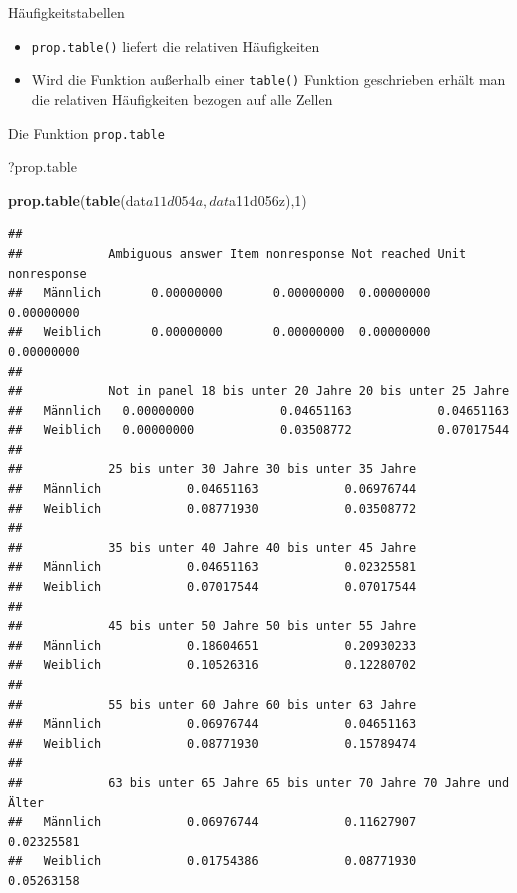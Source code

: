 \documentclass[ignorenonframetext,]{beamer}
\newenvironment{Shaded}{}{}
\newcommand{\KeywordTok}[1]{\textcolor[rgb]{0.00,0.44,0.13}{\textbf{{#1}}}}
\newcommand{\DecValTok}[1]{\textcolor[rgb]{0.25,0.63,0.44}{{#1}}}
\newcommand{\NormalTok}[1]{{#1}}
\providecommand{\tightlist}{%
\setlength{\itemsep}{0pt}\setlength{\parskip}{0pt}}
\begin{document}
\begin{frame}[fragile]{Häufigkeitstabellen}

\begin{itemize}
\tightlist
\item
  \texttt{prop.table()} liefert die relativen Häufigkeiten
\item
  Wird die Funktion außerhalb einer \texttt{table()} Funktion
  geschrieben erhält man die relativen Häufigkeiten bezogen auf alle
  Zellen
\end{itemize}

\end{frame}

\begin{frame}[fragile]{Die Funktion \texttt{prop.table}}

\begin{Shaded}
\begin{Highlighting}[]
\NormalTok{?prop.table}
\end{Highlighting}
\end{Shaded}

\begin{Shaded}
\begin{Highlighting}[]
\KeywordTok{prop.table}\NormalTok{(}\KeywordTok{table}\NormalTok{(dat$a11d054a,dat$a11d056z),}\DecValTok{1}\NormalTok{)}
\end{Highlighting}
\end{Shaded}

\begin{verbatim}
##           
##            Ambiguous answer Item nonresponse Not reached Unit nonresponse
##   Männlich       0.00000000       0.00000000  0.00000000       0.00000000
##   Weiblich       0.00000000       0.00000000  0.00000000       0.00000000
##           
##            Not in panel 18 bis unter 20 Jahre 20 bis unter 25 Jahre
##   Männlich   0.00000000            0.04651163            0.04651163
##   Weiblich   0.00000000            0.03508772            0.07017544
##           
##            25 bis unter 30 Jahre 30 bis unter 35 Jahre
##   Männlich            0.04651163            0.06976744
##   Weiblich            0.08771930            0.03508772
##           
##            35 bis unter 40 Jahre 40 bis unter 45 Jahre
##   Männlich            0.04651163            0.02325581
##   Weiblich            0.07017544            0.07017544
##           
##            45 bis unter 50 Jahre 50 bis unter 55 Jahre
##   Männlich            0.18604651            0.20930233
##   Weiblich            0.10526316            0.12280702
##           
##            55 bis unter 60 Jahre 60 bis unter 63 Jahre
##   Männlich            0.06976744            0.04651163
##   Weiblich            0.08771930            0.15789474
##           
##            63 bis unter 65 Jahre 65 bis unter 70 Jahre 70 Jahre und Älter
##   Männlich            0.06976744            0.11627907         0.02325581
##   Weiblich            0.01754386            0.08771930         0.05263158
\end{verbatim}

\end{frame}
\end{document}
